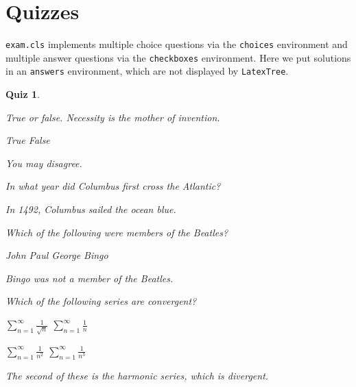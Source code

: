 \documentclass[12pt]{exam}
\newcommand{\correct}{\correctchoice}
\newcommand{\incorrect}{\choice}
\newcommand{\responsetitle}{\noindent\textbf{Response:}\enspace}
\newcommand{\resp}[1]{\ifprintanswers\qquad\fbox{\responsetitle\normalfont #1}\fi}
\renewcommand{\resp}[1]{}
\theoremstyle{break}
\newtheorem{quiz}[exercise]{Quiz}
\begin{document}
\newpage
\section{Quizzes}

{\tt exam.cls} implements multiple choice questions via the \texttt{choices} environment and multiple answer questions via the \texttt{checkboxes} environment. Here we put solutions in an {\tt answers} environment, which are not displayed by {\tt LatexTree}.

\begin{quiz}\label{quiz:frivolous}
\begin{questions} 

\question True or false. Necessity is the mother of invention.
\begin{choices}
\correct True 		
\incorrect False		
\end{choices}
\begin{answer}
You may disagree.
\end{answer}

\question In what year did Columbus first cross the Atlantic?
\begin{choices}
\incorrect 1490 \resp{Sorry, better luck next time.}
\incorrect 1491 \resp{Sorry, better luck next time.}
\correct   1492 \resp{Correct, well done.}
\incorrect 1493 \resp{Sorry, better luck next time.}
\end{choices}
\begin{answer}
In 1492, Columbus sailed the ocean blue.
\end{answer}

\question 
Which of the following were members of the Beatles?  
\noindent
\begin{checkboxes}
\correct John 
\correct Paul
\correct George
\incorrect Bingo 
\end{checkboxes}
\begin{answer}
Bingo was not a member of the Beatles.
\end{answer}

\question
\label{qu:series}
Which of the following series are convergent?
\begin{checkboxes}
\incorrect $\sum_{n=1}^{\infty}\frac{1}{\sqrt{n}}$
\incorrect $\sum_{n=1}^{\infty}\frac{1}{n}$ 
	\resp{This is the \emph{harmonic} series, which is divergent.}
\correct $\sum_{n=1}^{\infty}\frac{1}{n^2}$
\correct $\sum_{n=1}^{\infty}\frac{1}{n^3}$
\end{checkboxes}
\begin{answer}
The second of these is the \emph{harmonic} series, which is divergent.
\end{answer}
\end{questions}
\end{quiz}
\end{document}
